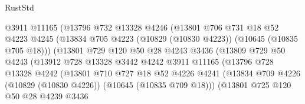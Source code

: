\begin{lexlean}{RustStd}
\begin{coremodule}
                            @3911
                            @11165
                            (@13796
                              @732
                              @13328
                              @4246
                              (@13801
                                @706
                                @731
                                @18
                                @52
                                @4223
                                @4245
                                (@13834
                                  @705
                                  @4223
                                  (@10829 (@10830 @4223))
                                  (@10645 (@10835 @705 @18)))
                                (@13801
                                  @729
                                  @120
                                  @50
                                  @28
                                  @4243
                                  @3436
                                  (@13809
                                    @729
                                    @50
                                    @4243
                                    (@13912
                                      @728
                                      @13328
                                      @3442
                                      @4242
                                      @3911
                                      @11165
                                      (@13796
                                        @728
                                        @13328
                                        @4242
                                        (@13801
                                          @710
                                          @727
                                          @18
                                          @52
                                          @4226
                                          @4241
                                          (@13834
                                            @709
                                            @4226
                                            (@10829 (@10830 @4226))
                                            (@10645 (@10835 @709 @18)))
                                          (@13801
                                            @725
                                            @120
                                            @50
                                            @28
                                            @4239
                                            @3436

\end{coremodule}
\end{lexlean}

